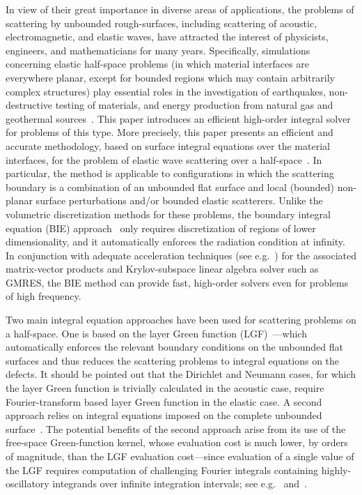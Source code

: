 \documentclass[10pt]{article}
\numberwithin{equation}{section}
\begin{document}
In view of their great importance in diverse areas of applications,
the problems of scattering by unbounded rough-surfaces, including
scattering of acoustic, electromagnetic, and elastic waves, have
attracted the interest of physicists, engineers, and mathematicians
for many years. Specifically, simulations concerning elastic
half-space problems (in which material interfaces are everywhere
planar, except for bounded regions which may contain arbitrarily
complex structures) play essential roles in the investigation of
earthquakes, non-destructive testing of materials, and energy
production from natural gas and geothermal
sources~\cite{A73,AR02,S09}. This paper introduces an efficient
high-order integral solver for problems of this type. More precisely,
this paper presents an efficient and accurate methodology, based on
surface integral equations over the material interfaces, for the
problem of elastic wave scattering over a
half-space~\cite{A00,A01,A02,EH12,EH15}. In particular, the method is
applicable to configurations in which the scattering boundary is a
combination of an unbounded flat surface and local (bounded)
non-planar surface perturbations and/or bounded elastic scatterers. Unlike
the volumetric discretization methods for these problems, the
boundary integral equation (BIE) approach~\cite{HW08,N01} only
requires discretization of regions of lower dimensionality, and it
automatically enforces the radiation condition at infinity. In
conjunction with adequate acceleration techniques (see
e.g.~\cite{BK01,CBS08,L09}) for the associated matrix-vector products
and Krylov-subspace linear algebra solver such as GMRES, the BIE
method can provide fast, high-order solvers even for problems of high
frequency.

Two main integral equation approaches have been used for scattering
problems on a half-space. One is based on the layer Green function
(LGF)~\cite{A00,CB14,DGN10,DMN11}---which automatically enforces the
relevant boundary conditions on the unbounded flat surfaces and thus
reduces the scattering problems to integral equations on the
defects. It should be pointed out that the Dirichlet and Neumann
cases, for which the layer Green function is trivially calculated in
the acoustic case, require Fourier-transform based layer Green
function in the elastic case. A second approach relies on integral
equations imposed on the complete unbounded
surface~\cite{BLPT16,DM97,CGK02,P16}. The potential benefits of the
second approach arise from its use of the free-space Green-function
kernel, whose evaluation cost is much lower, by orders of magnitude,
than the LGF evaluation cost---since evaluation of a single value of
the LGF requires computation of challenging Fourier integrals
containing highly-oscillatory integrands over infinite integration
intervals; see e.g.~\cite[Eq. (2.27)]{A00} and~\cite[Eq. (26)]{CB14}.
\end{document}
